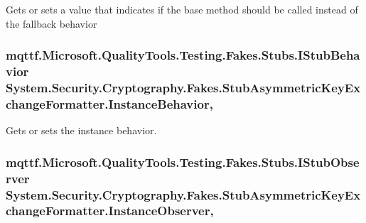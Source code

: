 Gets or sets a value that indicates if the base method should be called instead of the fallback behavior

\hypertarget{class_system_1_1_security_1_1_cryptography_1_1_fakes_1_1_stub_asymmetric_key_exchange_formatter_a829490daf7ad429b1b6d8f4fa9197da2}{
\subsubsection[{Instance\-Behavior}]{\setlength{\rightskip}{0pt plus 5cm}mqttf.\-Microsoft.\-Quality\-Tools.\-Testing.\-Fakes.\-Stubs.\-I\-Stub\-Behavior System.\-Security.\-Cryptography.\-Fakes.\-Stub\-Asymmetric\-Key\-Exchange\-Formatter.\-Instance\-Behavior\hspace{0.3cm}{\ttfamily [get]}, {\ttfamily [set]}}}\label{class_system_1_1_security_1_1_cryptography_1_1_fakes_1_1_stub_asymmetric_key_exchange_formatter_a829490daf7ad429b1b6d8f4fa9197da2}


Gets or sets the instance behavior.

\hypertarget{class_system_1_1_security_1_1_cryptography_1_1_fakes_1_1_stub_asymmetric_key_exchange_formatter_af570116d1be70392313ea15a865b7542}{
\subsubsection[{Instance\-Observer}]{\setlength{\rightskip}{0pt plus 5cm}mqttf.\-Microsoft.\-Quality\-Tools.\-Testing.\-Fakes.\-Stubs.\-I\-Stub\-Observer System.\-Security.\-Cryptography.\-Fakes.\-Stub\-Asymmetric\-Key\-Exchange\-Formatter.\-Instance\-Observer\hspace{0.3cm}{\ttfamily [get]}, {\ttfamily [set]}}}\label{class_system_1_1_security_1_1_cryptography_1_1_fakes_1_1_stub_asymmetric_key_exchange_formatter_af570116d1be70392313ea15a865b7542}



